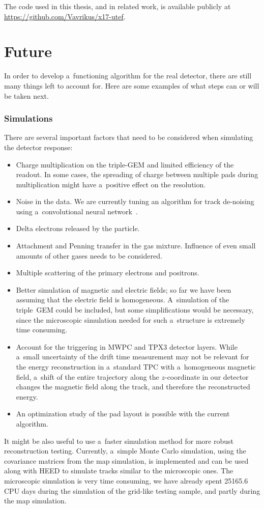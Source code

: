 		The code used in this thesis, and in related work, is available publicly at \url{https://github.com/Vavrikus/x17-utef}.
	\section*{Future}
		In order to develop a~functioning algorithm for the real detector, there are still many things left to account for. Here are some examples of what steps can or will be taken next.
		
	\subsubsection*{Simulations}
		There are several important factors that need to be considered when simulating the detector response:
		\begin{itemize}
			\item Charge multiplication on the triple-\ac{GEM} and limited efficiency of the readout. In some cases, the spreading of charge between multiple pads during multiplication might have a~positive effect on the resolution.
			\item Noise in the data. We are currently tuning an algorithm for track de-noising using a~convolutional neural network~\cite{Gajdoš_2025}.
			\item Delta electrons released by the particle.
			\item Attachment and Penning transfer in the gas mixture. Influence of even small amounts of other gases needs to be considered.
			\item Multiple scattering of the primary electrons and positrons.
			\item Better simulation of magnetic and electric fields; so far we have been assuming that the electric field is homogeneous. A~simulation of the triple~\ac{GEM} could be included, but some simplifications would be necessary, since the microscopic simulation needed for such a~structure is extremely time consuming.
			\item Account for the triggering in \ac{MWPC} and \acf{TPX3} detector layers. While a~small uncertainty of the drift time measurement may not be relevant for the energy reconstruction in a~standard \ac{TPC} with a~homogeneous magnetic field, a~shift of the entire trajectory along the $z$\nobreakdash-coordinate in our detector changes the magnetic field along the track, and therefore the reconstructed energy.
			\item An optimization study of the pad layout is possible with the current algorithm.
		\end{itemize}
		It might be also useful to use a~faster simulation method for more robust reconstruction testing. Currently, a~simple Monte Carlo simulation, using the covariance matrices from the map simulation, is implemented and can be used along with \ac{HEED} to simulate tracks similar to the microscopic ones. The microscopic simulation is very time consuming, we have already spent \num{25165.6} CPU days during the simulation of the grid-like testing sample, and partly during the map simulation.
		
